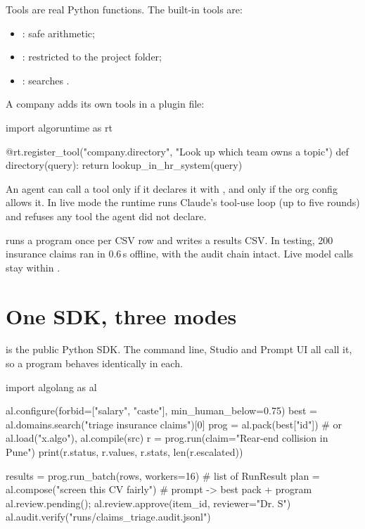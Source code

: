 Tools are real Python functions. The built-in tools are:
\begin{itemize}
\item {}: safe arithmetic;
\item {}: restricted to the project folder;
\item {}: searches .
\end{itemize}

A company adds its own tools in a plugin file:

\begin{pycode}
import algoruntime as rt

@rt.register_tool("company.directory", "Look up which team owns a topic")
def directory(query):
    return lookup_in_hr_system(query)
\end{pycode}

An agent can call a tool only if it declares it with , and only if the org config allows it. In live mode the runtime runs Claude's tool-use loop (up to five rounds) and refuses any tool the agent did not declare.

 runs a program once per CSV row and writes a results CSV. In testing, 200 insurance claims ran in 0.6\,s offline, with the audit chain intact. Live model calls stay within .

\section{One SDK, three modes}

 is the public Python SDK. The command line, Studio and Prompt UI all call it, so a program behaves identically in each.

\begin{pycode}
import algolang as al

al.configure(forbid=["salary", "caste"], min_human_below=0.75)
best = al.domains.search("triage insurance claims")[0]
prog = al.pack(best["id"])                      # or al.load("x.algo"), al.compile(src)
r = prog.run(claim="Rear-end collision in Pune")
print(r.status, r.values, r.stats, len(r.escalated))

results = prog.run_batch(rows, workers=16)      # list of RunResult
plan = al.compose("screen this CV fairly")      # prompt -> best pack + program
al.review.pending(); al.review.approve(item_id, reviewer="Dr. S")
al.audit.verify("runs/claims_triage.audit.jsonl")
\end{pycode}

